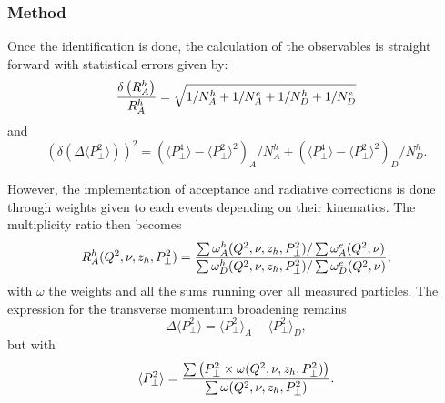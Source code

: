 \subsubsection{Method}
\label{RatioCalc}

Once the identification is done, the calculation of the observables is 
straight forward with statistical errors given by:
\begin{equation}
{\delta \left ( R_A^h \right ) \over R_A^h} = \sqrt{ 1 /N_A^h + 1/ N_A^e +1/N_D^h + 1/N_D^e}
\end{equation}
and
\begin{equation}
\left ( \delta \left ( \Delta \langle P_\perp^2 \rangle \right ) \right )^2 = 
   \left ({\langle P_\perp^4 \rangle - \langle P_\perp^2 \rangle ^2}\right )_A / N_A^h
 + \left ({\langle P_\perp^4 \rangle - \langle P_\perp^2 \rangle ^2}\right )_D / N_D^h.
\end{equation}

However, the implementation of acceptance and radiative corrections is done through weights
given to each events depending on their kinematics. The multiplicity ratio then becomes
\begin{equation}
R_A^h (Q^2,\nu,z_h,P_\perp^2) = {{\sum \omega_A^h (Q^2,\nu,z_h,P_\perp^2) / \sum \omega_A^e (Q^2,\nu)} 
                       \over {\sum \omega_D^h (Q^2,\nu,z_h,P_\perp^2) / \sum \omega_D^e (Q^2,\nu)}},
\end{equation}
with $\omega$ the weights and all the sums running over all measured particles.
The expression for the transverse momentum broadening remains
\begin{equation}
\Delta \langle P_\perp^2 \rangle = \langle P_\perp^2 \rangle_A - \langle P_\perp^2 \rangle_D,
\end{equation}
but with
\begin{equation}
\langle P_\perp^2 \rangle = {\sum \left ( P_\perp^2 \times \omega (Q^2,\nu,z_h,P_\perp^2) \right ) \over \sum \omega (Q^2,\nu,z_h,P_\perp^2)}.
\end{equation}

